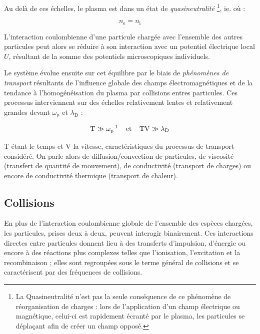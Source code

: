 \begin{refsection}
Au delà de ces échelles, le plasma est dans un état de \emph{quasineutralité}
\footnote{La Quasineutralité n'est pas la seule conséquence de ce phénomène de réorganisation
de charges : lors de l'application d'un champ électrique ou magnétique, celui-ci est rapidement
écranté par le plasma, les particules se
déplaçant afin de créer un champ opposé.}, 
ie. où :

\begin{equation}
n_\text{e}=n_\text{i}
\label{quasineutralité}
\end{equation}

L'interaction coulombienne d'une particule chargée avec l'ensemble des autres particules peut alors
se réduire à son interaction avec un potentiel électrique local $U$,
résultant de la somme des potentiels microscopiques individuels.

Le système évolue ensuite sur cet équilibre par le biais de
\emph{phénomènes de transport} résultants de l'influence
globale des champs électromagnétiques et de la tendance à
l'homogénéisation du plasma par collisions entres particules.
Ces processus interviennent sur des échelles relativement
lentes et relativement grandes devant $\omega_\text{p}$ et $\lambda_\text{D}$ :

\begin{equation}
\text{T}\gg \omega_\text{p}^{{-1}}
\;\;\;\;\text{et}\;\;\;\;\text{TV}\gg\lambda_\text{D}
\end{equation}

$\text{T}$ étant le temps et $\text{V} $ la vitesse, caractéristiques du
processus de transport considéré.
On parle alors de diffusion/convection de particules, de viscosité (transfert de
quantité de mouvement), de conductivité (transport de charges) ou encore de
conductivité thermique (transport de chaleur).

\subsection{Collisions}
\label{1-Collisions}
En plus de l'interaction coulombienne globale de l'ensemble des espèces chargées, 
les particules, prises deux à deux, peuvent interagir binairement. 
Ces interactions directes entre particules donnent lieu à des transferts
d'impulsion, d'énergie ou encore à des réactions plus complexes telles que
l'ionisation, l'excitation et la recombinaison ; elles sont regroupées
sous le terme général de collisions et se caractérisent par des fréquences de
collisions.


\end{refsection}
